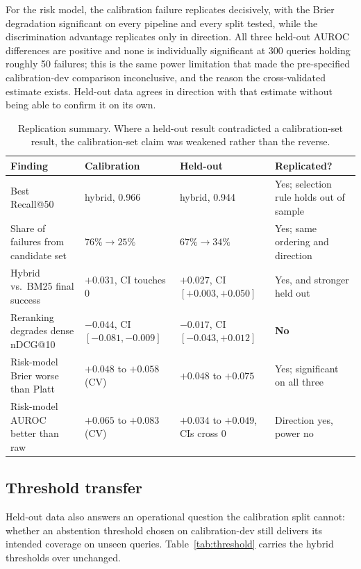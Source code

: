 \documentclass[11pt,a4paper]{article}
\begin{document}
For the risk model, the calibration failure replicates decisively, with the Brier degradation
significant on every pipeline and every split tested, while the discrimination advantage
replicates only in direction. All three held-out AUROC differences are positive and none is
individually significant at 300 queries holding roughly 50 failures; this is the same power
limitation that made the pre-specified calibration-dev comparison inconclusive, and the reason
the cross-validated estimate exists. Held-out data agrees in direction with that estimate
without being able to confirm it on its own.

\begin{table}[tbp]
\centering
\small
\caption{Replication summary. Where a held-out result contradicted a calibration-set result, the
calibration-set claim was weakened rather than the reverse.}
\label{tab:replication}
\footnotesize
\begin{tabular}{L{4.4cm}L{3.3cm}L{3.5cm}L{2.6cm}}
\toprule
Finding & Calibration & Held-out & Replicated? \\
\midrule
Best Recall@50 & hybrid, 0.966 & hybrid, 0.944 & Yes; selection rule holds out of sample \\
Share of failures from candidate set & $76\% \to 25\%$ & $67\% \to 34\%$ & Yes; same ordering and direction \\
Hybrid vs.\ BM25 final success & $+0.031$, CI touches 0 & $+0.027$, CI $[+0.003, +0.050]$ & Yes, and stronger held out \\
Reranking degrades dense nDCG@10 & $-0.044$, CI $[-0.081, -0.009]$ & $-0.017$, CI $[-0.043, +0.012]$ & \textbf{No} \\
Risk-model Brier worse than Platt & $+0.048$ to $+0.058$ (CV) & $+0.048$ to $+0.075$ & Yes; significant on all three \\
Risk-model AUROC better than raw & $+0.065$ to $+0.083$ (CV) & $+0.034$ to $+0.049$, CIs cross 0 & Direction yes, power no \\
\bottomrule
\end{tabular}
\end{table}

\subsection{Threshold transfer}
\label{sec:threshold}

Held-out data also answers an operational question the calibration split cannot: whether an
abstention threshold chosen on calibration-dev still delivers its intended coverage on unseen
queries. Table~\ref{tab:threshold} carries the hybrid thresholds over unchanged.
\end{document}
